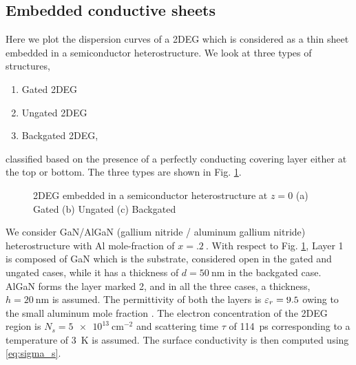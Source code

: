 \documentclass[12pt]{article}
\begin{document}
\subsection{Embedded conductive sheets}
%
%
Here we plot the dispersion curves of a 2DEG which is considered as a thin sheet embedded in a semiconductor heterostructure. We look at three types of structures,
%
\begin{enumerate}
  \item Gated 2DEG
  \item Ungated 2DEG
  \item Backgated 2DEG,
\end{enumerate}
%
classified based on the presence of a perfectly conducting covering layer either at the top or bottom. The three types are shown in Fig. \ref{fig:2deg_structure_types}.
%
\begin{figure}[t!]
   \hfil
   \hfil
   \hfil
  \caption{2DEG embedded in a semiconductor heterostructure at $z=0$ (a) Gated  (b) Ungated (c) Backgated}
  \label{fig:2deg_structure_types}
\end{figure}
%

We consider GaN/AlGaN (gallium nitride / aluminum gallium nitride)  heterostructure with Al mole-fraction of $x = \SI{.2}{}$. With respect to Fig. \ref{fig:2deg_structure_types}, Layer 1 is composed of GaN which is the substrate, considered open in the gated and ungated cases, while it has a thickness of $d = \SI{50}{\nm}$ in the backgated case. AlGaN forms the layer marked 2, and in all the three cases, a thickness, $h = \SI{20}{\nm}$ is assumed. The permittivity of both the layers is $\varepsilon_r = 9.5$ owing to the small aluminum mole fraction \cite{}. The electron concentration of the 2DEG region is $N_s = \SI{5e13}{\cm^{-2}}$ and scattering time $\tau$ of \SI{114}{\ps} corresponding to a temperature of \SI{3}{\kelvin} is assumed. The surface conductivity is then computed using \eqref{eq:sigma_s}.    
\clearpage %
% 


\end{document}
